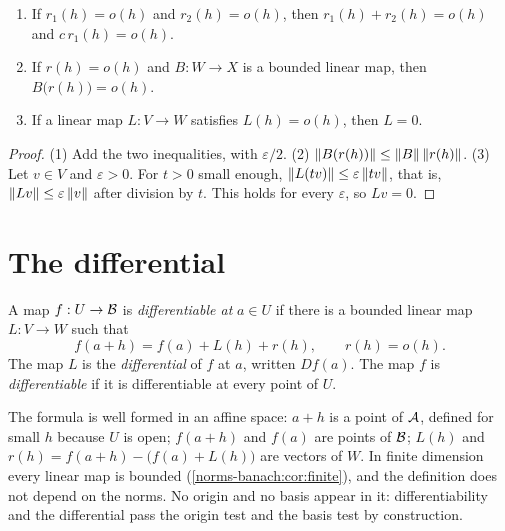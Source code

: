 \begin{notechapter}
\begin{lemma}\label{differential:lem:little-o}
\begin{enumerate}[nosep]
  \item If $r_1(h) = o(h)$ and $r_2(h) = o(h)$, then
        $r_1(h) + r_2(h) = o(h)$ and $c\,r_1(h) = o(h)$.
  \item If $r(h) = o(h)$ and $B:W\to X$ is a bounded linear map, then
        $B\bigl(r(h)\bigr) = o(h)$.
  \item If a linear map $L:V\to W$ satisfies $L(h) = o(h)$, then $L = 0$.
\end{enumerate}
\end{lemma}

\begin{proof}
(1) Add the two inequalities, with $\varepsilon/2$. (2)
$\left\|B(r(h))\right\|\leq\left\|B\right\|\left\|r(h)\right\|$. (3) Let $v\in V$ and
$\varepsilon > 0$. For $t > 0$ small enough,
$\left\|L(tv)\right\|\leq\varepsilon\left\|tv\right\|$, that is,
$\left\|Lv\right\|\leq\varepsilon\left\|v\right\|$ after division by $t$. This holds for
every $\varepsilon$, so $Lv = 0$.
\end{proof}

\section{The differential}\label{differential:sec:definition}

\begin{definition}[Differential]\label{differential:def:differential}
A map $f:U\to\mathcal{B}$ is \emph{differentiable at} $a\in U$ if there is a
bounded linear map $L:V\to W$ such that
\begin{equation}\label{differential:eq:definition}
  f(a + h) = f(a) + L(h) + r(h), \qquad r(h) = o(h) .
\end{equation}
The map $L$ is the \emph{differential} of $f$ at $a$, written $Df(a)$.
The map $f$ is \emph{differentiable} if it is differentiable at every
point of $U$.
\end{definition}

The formula is well formed in an affine space: $a + h$ is a point of
$\mathcal{A}$, defined for small $h$ because $U$ is open; $f(a + h)$ and $f(a)$
are points of $\mathcal{B}$; $L(h)$ and
$r(h) = f(a + h) - \bigl(f(a) + L(h)\bigr)$ are vectors of $W$. In finite
dimension every linear map is bounded
(\cref{norms-banach:cor:finite}), and the definition does not depend on
the norms. No origin and no basis appear in it: differentiability and the
differential pass the origin test and the basis test by construction.


\end{notechapter}
